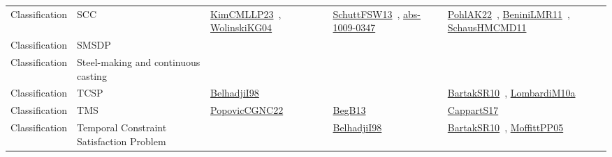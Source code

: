 {\begin{longtable}{lp{3cm}>{\raggedright\arraybackslash}p{6cm}>{\raggedright\arraybackslash}p{6cm}>{\raggedright\arraybackslash}p{8cm}}
Classification & SCC & \href{works/KimCMLLP23.pdf}{KimCMLLP23}~\cite{KimCMLLP23}, \href{works/WolinskiKG04.pdf}{WolinskiKG04}~\cite{WolinskiKG04} & \href{works/SchuttFSW13.pdf}{SchuttFSW13}~\cite{SchuttFSW13}, \href{works/abs-1009-0347.pdf}{abs-1009-0347}~\cite{abs-1009-0347} & \href{works/PohlAK22.pdf}{PohlAK22}~\cite{PohlAK22}, \href{works/BeniniLMR11.pdf}{BeniniLMR11}~\cite{BeniniLMR11}, \href{works/SchausHMCMD11.pdf}{SchausHMCMD11}~\cite{SchausHMCMD11}\\
Classification & SMSDP &  &  & \\
Classification & Steel-making and continuous casting &  &  & \\
Classification & TCSP & \href{works/BelhadjiI98.pdf}{BelhadjiI98}~\cite{BelhadjiI98} &  & \href{works/BartakSR10.pdf}{BartakSR10}~\cite{BartakSR10}, \href{works/LombardiM10a.pdf}{LombardiM10a}~\cite{LombardiM10a}\\
Classification & TMS & \href{works/PopovicCGNC22.pdf}{PopovicCGNC22}~\cite{PopovicCGNC22} & \href{works/BegB13.pdf}{BegB13}~\cite{BegB13} & \href{works/CappartS17.pdf}{CappartS17}~\cite{CappartS17}\\
Classification & Temporal Constraint Satisfaction Problem &  & \href{works/BelhadjiI98.pdf}{BelhadjiI98}~\cite{BelhadjiI98} & \href{works/BartakSR10.pdf}{BartakSR10}~\cite{BartakSR10}, \href{works/MoffittPP05.pdf}{MoffittPP05}~\cite{MoffittPP05}\\

\end{longtable}}
